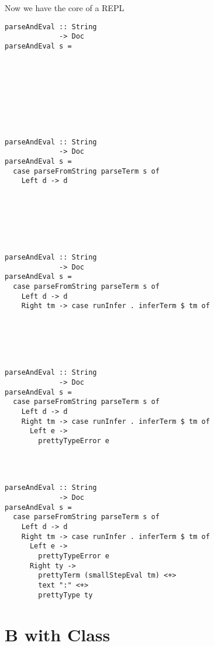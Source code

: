 \documentclass[aspectration=169]{beamer}
\begin{document}
\begin{frame}[fragile]
  \begin{center}
   Now we have the core of a REPL 
  \end{center}
  \begin{overprint}
  \begin{verbatim}
parseAndEval :: String
             -> Doc
parseAndEval s =









  \end{verbatim}
  \begin{verbatim}
parseAndEval :: String
             -> Doc
parseAndEval s =
  case parseFromString parseTerm s of
    Left d -> d







  \end{verbatim}
  \begin{verbatim}
parseAndEval :: String
             -> Doc
parseAndEval s =
  case parseFromString parseTerm s of
    Left d -> d
    Right tm -> case runInfer . inferTerm $ tm of






  \end{verbatim}
  \begin{verbatim}
parseAndEval :: String
             -> Doc
parseAndEval s =
  case parseFromString parseTerm s of
    Left d -> d
    Right tm -> case runInfer . inferTerm $ tm of
      Left e -> 
        prettyTypeError e




  \end{verbatim}
  \begin{verbatim}
parseAndEval :: String
             -> Doc
parseAndEval s =
  case parseFromString parseTerm s of
    Left d -> d
    Right tm -> case runInfer . inferTerm $ tm of
      Left e -> 
        prettyTypeError e
      Right ty ->
        prettyTerm (smallStepEval tm) <+> 
        text ":" <+> 
        prettyType ty
  \end{verbatim}
  \end{overprint}
\end{frame} 

\section{B with Class}
\end{document}
